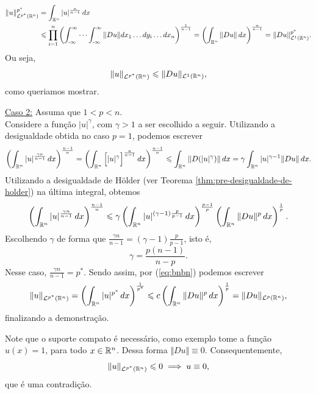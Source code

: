 \begin{prf}
    \[
        \begin{aligned}
            \Vert u \Vert_{\mathcal{L}^{p^*}(\mathbb{R}^n)}^{p^*} &= \int_{\mathbb{R}^n} |u|^{\frac{n}{n-1}} \, dx \\
            &\leqslant \prod_{i=1}^n \left( \int_{\text{-}\infty}^{\infty} \cdots \int_{\text{-}\infty}^\infty \Vert Du \Vert dx_1\dots dy_i \dots dx_n \right)^{\frac{1}{n-1}}
            = \left(\int_{\mathbb{R}^n} \Vert Du \Vert\,dx\right)^{\frac{n}{n-1}} = \Vert Du \Vert_{\mathcal{L}^1(\mathbb{R}^n)}^{p^*}.
        \end{aligned}
    \]
    Ou seja,
    \begin{equation} \label{eq:desigualdadegnss}
        \Vert u \Vert_{\mathcal{L}^{p^*}(\mathbb{R}^n)} \leqslant\Vert Du \Vert_{\mathcal{L}^1(\mathbb{R}^n)},
    \end{equation}
    como queriamos mostrar.

    \underline{Caso 2:} Assuma que $1 < p < n$.\\
    Considere a função $|u|^\gamma$, com $\gamma > 1$ a ser escolhido a seguir. Utilizando a desigualdade obtida no caso $p = 1$, podemos escrever
    \[
        \left( \int_{\mathbb{R}^n} |u|^{\frac{\gamma n}{n - 1}}  \, dx\right)^{\frac{n-1}{n}} = \left( \int_{\mathbb{R}^n} \Big[ |u|^\gamma \Big]^{\frac{n}{n-1}} \,dx \right)^{\frac{n-1}{n}} \leqslant \int_{\mathbb{R}^n} \Vert D(|u|^{\gamma}) \Vert \,dx = \gamma \int_{\mathbb{R}^n} |u|^{\gamma-1} \Vert Du \Vert \,dx.
    \]
    Utilizando a desigualdade de Hölder (ver Teorema \ref{thm:pre-desigualdade-de-holder}) na última integral, obtemos
    \begin{equation} \label{eq:bnbn}
        \left( \int_{\mathbb{R}^n} |u|^{\frac{\gamma n}{n - 1}}  \, dx\right)^{\frac{n-1}{n}} \leqslant \gamma\left( \int_{\mathbb{R}^n} |u|^{(\gamma-1)\frac{p}{p-1}} \,dx \right)^{\frac{p-1}{p}} \left( \int_{\mathbb{R}^n} \Vert Du \Vert^p \,dx \right)^{\frac{1}{p}}.
    \end{equation}
    Escolhendo $\gamma$ de forma que $\displaystyle\frac{\gamma n}{n - 1} = (\gamma -1)\frac{p}{p-1}$, isto é,
    \[
        \gamma = \frac{p(n-1)}{n-p}.
    \]
    Nesse caso, $\displaystyle\frac{\gamma n}{n-1} = p^*$. Sendo assim, por (\ref{eq:bnbn}) podemos escrever
    \[
        \Vert u \Vert_{\mathcal{L}^{p^*}(\mathbb{R}^n)} = \left( \int_{\mathbb{R}^n} |u|^{p^*} \,dx \right)^{\frac{1}{p^*}} \leqslant c \left( \int_{\mathbb{R}^n} \Vert Du \Vert^p \,dx\right)^{\frac{1}{p}} = \Vert Du \Vert_{\mathcal{L}^p(\mathbb{R}^n)},
    \]
    finalizando a demonstração.
\end{prf}

\obs Note que o suporte compato é necessário, como exemplo tome a função $u(x) = 1$, para todo $x \in \mathbb{R}^n$. Dessa forma $\Vert Du \Vert \equiv 0$. Consequentemente,
\[
    \Vert u \Vert_{\mathcal{L}^{p^*}(\mathbb{R}^n)} \leqslant 0 \implies u \equiv 0,
\]
que é uma contradição.

